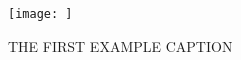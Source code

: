 \begin{figure}[h]
\begin{center}

    \begin{flushmiddle}

        \texttt{[image: ]}


                                \captionsetup{justification=centering}

        \caption{THE FIRST EXAMPLE CAPTION}	

    \end{flushmiddle}

\end{center}
\end{figure}